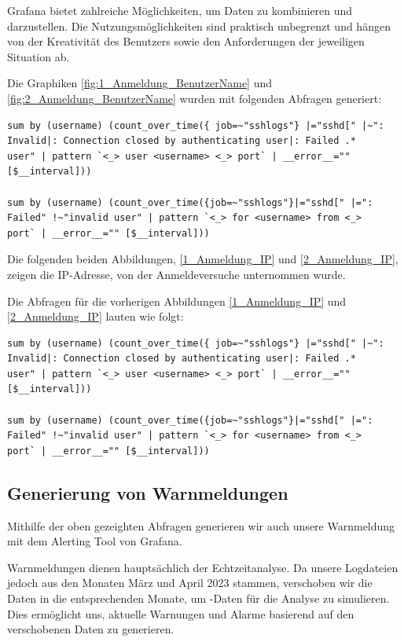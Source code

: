Grafana bietet zahlreiche Möglichkeiten, um Daten zu kombinieren und darzustellen. Die Nutzungsmöglichkeiten sind praktisch unbegrenzt und hängen von der Kreativität des Benutzers sowie den Anforderungen der jeweiligen Situation ab.

Die Graphiken \ref{fig:1_Anmeldung_BenutzerName} und \ref{fig:2_Anmeldung_BenutzerName} wurden mit folgenden Abfragen generiert:

{
\begin{Verbatim}[frame=single]
sum by (username) (count_over_time({ job=~"sshlogs"} |="sshd[" |~": 
Invalid|: Connection closed by authenticating user|: Failed .* 
user" | pattern `<_> user <username> <_> port` | __error__="" 
[$__interval]))

sum by (username) (count_over_time({job=~"sshlogs"}|="sshd[" |=": 
Failed" !~"invalid user" | pattern `<_> for <username> from <_> 
port` | __error__="" [$__interval]))
\end{Verbatim}
}

Die folgenden beiden Abbildungen, \ref{1_Anmeldung_IP} und \ref{2_Anmeldung_IP}, zeigen die IP-Adresse, von der Anmeldeversuche unternommen wurde.







Die Abfragen für die vorherigen Abbildungen \ref{1_Anmeldung_IP} und \ref{2_Anmeldung_IP} lauten wie folgt:
{
\begin{Verbatim}[frame=single]
sum by (username) (count_over_time({ job=~"sshlogs"} |="sshd[" |~": 
Invalid|: Connection closed by authenticating user|: Failed .* 
user" | pattern `<_> user <username> <_> port` | __error__="" 
[$__interval]))

sum by (username) (count_over_time({job=~"sshlogs"}|="sshd[" |=": 
Failed" !~"invalid user" | pattern `<_> for <username> from <_> 
port` | __error__="" [$__interval]))
\end{Verbatim}
}

\subsection{Generierung von Warnmeldungen}

Mithilfe der oben gezeighten Abfragen generieren wir auch unsere Warnmeldung mit dem Alerting Tool von Grafana.

Warnmeldungen dienen hauptsächlich der Echtzeitanalyse. Da unsere Logdateien jedoch aus den Monaten März und April 2023 stammen, verschoben wir die Daten in die entsprechenden Monate, um  -Daten für die Analyse zu simulieren. Dies ermöglicht uns, aktuelle Warnungen und Alarme basierend auf den verschobenen Daten zu generieren.

